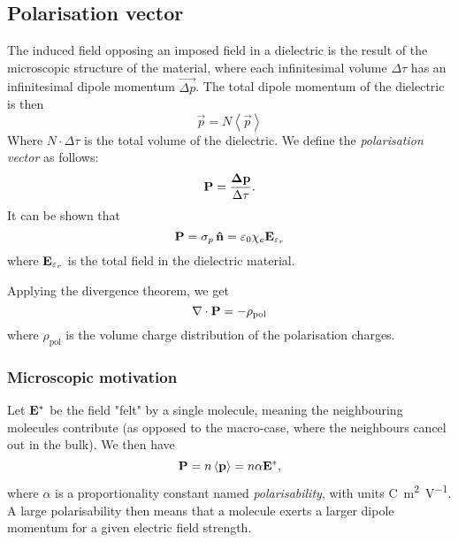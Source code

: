 \subsection{Polarisation vector} \label{Polarisation vector}
    The induced field opposing an imposed field in a dielectric is the result of the microscopic structure of the material, 
    where each infinitesimal volume $\Delta \tau$ has an infinitesimal dipole momentum $\vec{\Delta p}$. 
    The total dipole momentum of the dielectric is then 
    \begin{equation}
        \vec{p} = N\left< \vec{p} \right>
    \end{equation}
    Where $N\cdot\Delta\tau$ is the total volume of the dielectric. We define the \textit{polarisation vector} as follows:
    \begin{equation}
        \mathbf{P} = \frac{\mathbf{\Delta p}}{\Delta \tau}.
    \end{equation}
    It can be shown that 
    \begin{equation}
        \label{P as surface density}
        \p = \sigma_p\,\hat{n} = \e \chi_e \E_{\epsilon_r}
    \end{equation}
    where $\mathbf{E}_{\varepsilon_r}$ is the total field in the dielectric material.
    
    Applying the divergence theorem, we get
    \begin{equation}
        \nabla \cdot \mathbf{P} = - \rho_{\text{pol}}
    \end{equation}
    where $\rho_{\text{pol}}$ is the volume charge distribution of the polarisation charges.

    \subsubsection*{Microscopic motivation}
        Let $\mathbf{E}^*$ be the field "felt" by a single molecule, meaning the neighbouring molecules contribute 
        (as opposed to the macro-case, where the neighbours cancel out in the bulk). We then have
        \begin{equation}
            \label{polarisability}
            \mathbf{P} = n\left<\mathbf{p}\right> = n\alpha\mathbf{E}^*,
        \end{equation}
        where $\alpha$ is a proportionality constant named \textit{polarisability}, with units \si{\coulomb\metre\squared\per\volt}. 
        A large polarisability then means that a molecule exerts a larger dipole momentum for a given electric field strength. 

